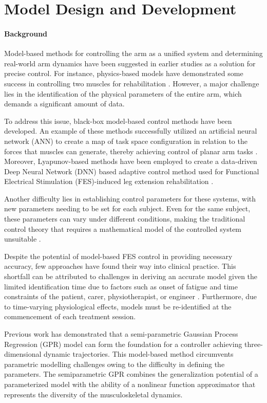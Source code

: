 \newpage
\chapter{Model Design and Development}\label{sec:model}
\subsubsection{Background}
Model-based methods for controlling the arm as a unified system and determining real-world arm dynamics have been suggested in earlier studies as a solution for precise control. For instance, physics-based models have demonstrated some success in controlling two muscles for rehabilitation \cite{IOL}. However, a major challenge lies in the identification of the physical parameters of the entire arm, which demands a significant amount of data.

To address this issue, black-box model-based control methods have been developed. An example of these methods successfully utilized an artificial neural network (ANN) to create a map of task space configuration in relation to the forces that muscles can generate, thereby achieving control of planar arm tasks \cite{FC2D}. Moreover, Lyapunov-based methods have been employed to create a data-driven Deep Neural Network (DNN) based adaptive control method used for Functional Electrical Stimulation (FES)-induced leg extension rehabilitation \cite{CLDNN}.

Another difficulty lies in establishing control parameters for these systems, with new parameters needing to be set for each subject. Even for the same subject, these parameters can vary under different conditions, making the traditional control theory that requires a mathematical model of the controlled system unsuitable \cite{NNPID}. 

Despite the potential of model-based FES control in providing necessary accuracy, few approaches have found their way into clinical practice. This shortfall can be attributed to challenges in deriving an accurate model given the limited identification time due to factors such as onset of fatigue and time constraints of the patient, carer, physiotherapist, or engineer \cite{IOL}. Furthermore, due to time-varying physiological effects, models must be re-identified at the commencement of each treatment session.

Previous work has demonstrated that a semi-parametric Gaussian Process Regression (GPR) model can form the foundation for a controller achieving three-dimensional dynamic trajectories. This model-based method \cite{QSC} circumvents parametric modelling challenges owing to the difficulty in defining the parameters. The semiparametric GPR combines the generalization potential of a parameterized model with the ability of a nonlinear function approximator that represents the diversity of the musculoskeletal dynamics. 

